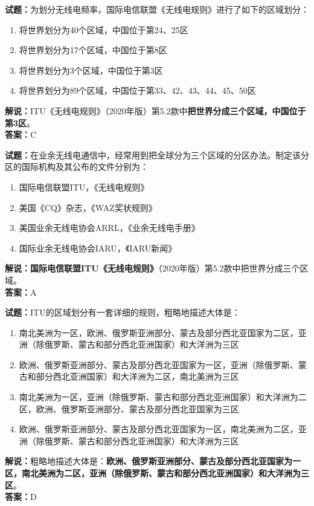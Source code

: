 \documentclass{ctexbook}
\begin{document}
\noindent\textbf{试题：}为划分无线电频率，国际电信联盟《无线电规则》进行了如下的区域划分：
\begin{enumerate}[leftmargin=3em]
\item 将世界划分为40个区域，中国位于第24、25区
\item 将世界划分为17个区域，中国位于第8区
\item 将世界划分为3个区域，中国位于第3区
\item 将世界划分为89个区域，中国位于第33、42、43、44、45、50区
\end{enumerate}
\noindent\textbf{解说：}ITU《无线电规则》（2020年版）第5.2款中\textbf{把世界分成三个区域，中国位于第3区}。\\\noindent\textbf{答案：}C



\bigskip


\noindent\textbf{试题：}在业余无线电通信中，经常用到把全球分为三个区域的分区办法。制定该分区的国际机构及其公布的文件分别为：
\begin{enumerate}[leftmargin=3em]
\item 国际电信联盟ITU，《无线电规则》
\item 美国《CQ》杂志，《WAZ奖状规则》
\item 美国业余无线电协会ARRL，《业余无线电手册》
\item 国际业余无线电协会IARU，《IARU新闻》
\end{enumerate}
\noindent\textbf{解说：}\textbf{国际电信联盟ITU《无线电规则》}（2020年版）第5.2款中把世界分成三个区域。\\\noindent\textbf{答案：}A




\bigskip


\noindent\textbf{试题：}ITU的区域划分有一套详细的规则，粗略地描述大体是：
\begin{enumerate}[leftmargin=3em]
\item 南北美洲为一区，欧洲、俄罗斯亚洲部分、蒙古及部分西北亚国家为二区，亚洲（除俄罗斯、蒙古和部分西北亚洲国家）和大洋洲为三区
\item 欧洲、俄罗斯亚洲部分、蒙古及部分西北亚国家为一区，亚洲（除俄罗斯、蒙古和部分西北亚洲国家）和大洋洲为二区，南北美洲为三区%
\item 南北美洲为一区，亚洲（除俄罗斯、蒙古和部分西北亚洲国家）和大洋洲为二区，欧洲、俄罗斯亚洲部分、蒙古及部分西北亚国家为三区
\item 欧洲、俄罗斯亚洲部分、蒙古及部分西北亚国家为一区，南北美洲为二区，亚洲（除俄罗斯、蒙古和部分西北亚洲国家）和大洋洲为三区
\end{enumerate}
\noindent\textbf{解说：}粗略地描述大体是：\textbf{欧洲、俄罗斯亚洲部分、蒙古及部分西北亚国家为一区，南北美洲为二区，亚洲（除俄罗斯、蒙古和部分西北亚洲国家）和大洋洲为三区}。\\\noindent\textbf{答案：}D
\end{document}
